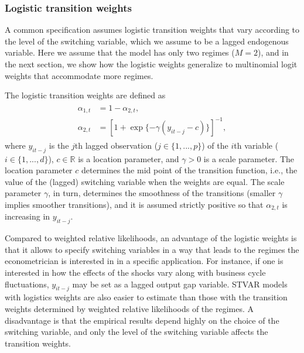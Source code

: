 \documentclass[nojss]{jss}
\begin{document}
\subsubsection{Logistic transition weights}\label{sec:logistic_weights}

A common specification assumes logistic transition weights \citep[e.g.,][]{Anderson+Vahid:1998} that vary according to the level of the switching variable, which we assume to be a lagged endogenous variable. Here we assume that the model has only two regimes ($M=2$), and in the next section, we show how the logistic weights generalize to multinomial logit weights that accommodate more regimes.

The logistic transition weights are defined as
\begin{align}\label{eq:alpha_mt_logistic}
\begin{aligned}
\alpha_{1,t} &= 1 - \alpha_{2,t},\\
\alpha_{2,t} &= [1 + \exp\lbrace -\gamma(y_{it-j} - c)\rbrace ]^{-1},
\end{aligned}
\end{align}
where $y_{it-j}$ is the $j$th lagged observation ($j\in \lbrace 1,...,p \rbrace$) of the $i$th variable ($i\in \lbrace 1,...,d \rbrace$), $c\in\mathbb{R}$ is a location parameter, and $\gamma > 0$ is a scale parameter. The location parameter $c$ determines the mid point of the transition function, i.e., the value of the (lagged) switching variable when the weights are equal. The scale parameter $\gamma$, in turn,  determines the smoothness of the transitions (smaller $\gamma$ implies smoother transitions), and it is assumed strictly positive so that $\alpha_{2,t}$ is increasing in $y_{it-j}$.

Compared to weighted relative likelihoods, an advantage of the logistic weights is that it allows to specify switching variables in a way that leads to the regimes the econometrician is interested in in a specific application. For instance, if one is interested in how the effects of the shocks vary along with business cycle fluctuations, $y_{it-j}$ may be set as a lagged output gap variable. STVAR models with logistics weights are also easier to estimate than those with the transition weights determined by weighted relative likelihoods of the regimes. A disadvantage is that the empirical results depend highly on the choice of the switching variable, and only the level of the switching variable affects the transition weights.
\end{document}
